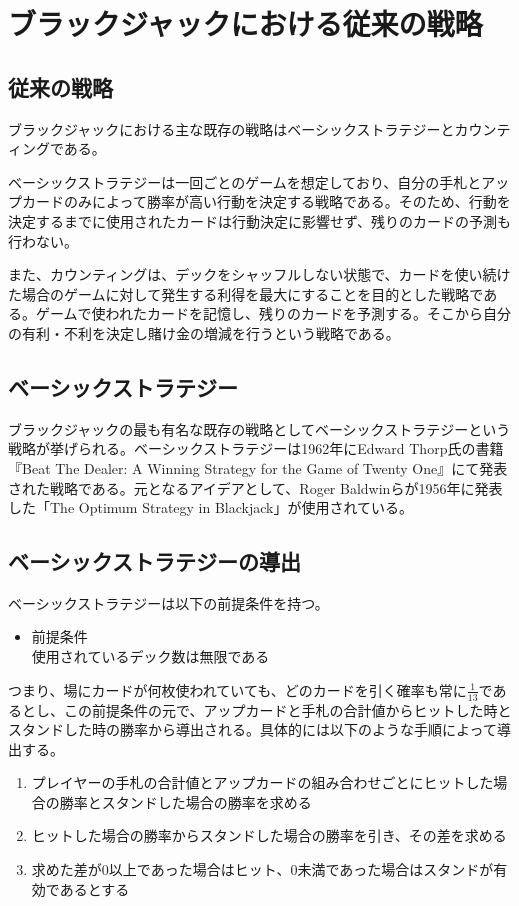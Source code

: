     \section{ブラックジャックにおける従来の戦略}
    \subsection{従来の戦略}

        ブラックジャックにおける主な既存の戦略はベーシックストラテジーとカウンティングである。

        ベーシックストラテジーは一回ごとのゲームを想定しており、自分の手札とアップカードのみによって勝率が高い行動を決定する戦略である。そのため、行動を決定するまでに使用されたカードは行動決定に影響せず、残りのカードの予測も行わない。

        また、カウンティングは、デックをシャッフルしない状態で、カードを使い続けた場合のゲームに対して発生する利得を最大にすることを目的とした戦略である。ゲームで使われたカードを記憶し、残りのカードを予測する。そこから自分の有利・不利を決定し賭け金の増減を行うという戦略である。
    \subsection{ベーシックストラテジー}
        ブラックジャックの最も有名な既存の戦略としてベーシックストラテジーという戦略が挙げられる。ベーシックストラテジーは1962年にEdward Thorp氏の書籍『Beat The Dealer: A Winning Strategy for the Game of Twenty One』にて発表された戦略である。元となるアイデアとして、Roger Baldwinらが1956年に発表した「The Optimum Strategy in Blackjack」が使用されている。
    \subsection{ベーシックストラテジーの導出}
        ベーシックストラテジーは以下の前提条件を持つ。
        \begin{itemize}
            \item 前提条件\\
                使用されているデック数は無限である
        \end{itemize}

        つまり、場にカードが何枚使われていても、どのカードを引く確率も常に$\frac{1}{13}$であるとし、この前提条件の元で、アップカードと手札の合計値からヒットした時とスタンドした時の勝率から導出される。具体的には以下のような手順によって導出する。
        \begin{enumerate}
            \item プレイヤーの手札の合計値とアップカードの組み合わせごとにヒットした場合の勝率とスタンドした場合の勝率を求める
            \item ヒットした場合の勝率からスタンドした場合の勝率を引き、その差を求める
            \item 求めた差が0以上であった場合はヒット、0未満であった場合はスタンドが有効であるとする
        \end{enumerate}

